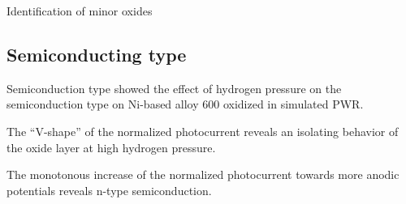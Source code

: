 \documentclass[10pt,compress,handout]{beamer}
\begin{document}
\begin{frame}{Identification of minor oxides}
\begin{figure}[h]
            \label{fig_benaboud_minor_oxides}
        \end{figure}
    \end{frame}

\subsection{Semiconducting type}
    \begin{frame}{Semiconduction type}
            \citet{loucif2013} showed the effect of hydrogen pressure on 
            the semiconduction type on Ni-based alloy 600 oxidized in simulated PWR. 
            
            The “V-shape” of the normalized photocurrent 
            reveals an isolating behavior of the oxide layer at high hydrogen pressure. 
            
            The monotonous increase of the 
            normalized photocurrent towards more anodic potentials reveals 
            n-type semiconduction.


\end{frame}
\end{document}
